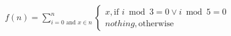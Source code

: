 \documentclass{article}
\begin{document}
\begin{align*}
    f(n) = \sum_{i=0 \text{ and } x \in n}^{n}{
        \begin{cases}
            x, \text{if } i \bmod 3 = 0 \lor i \bmod 5 = 0\\
            nothing, \text{otherwise}
        \end{cases}
    }
\end{align*}
\end{document}
